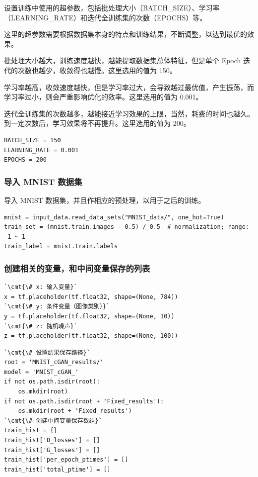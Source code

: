 \documentclass[a4paper, 12pt]{article}
\begin{document}
设置训练中使用的超参数，包括批处理大小（BATCH\_SIZE）、学习率（LEARNING\_RATE）和迭代全训练集的次数（EPOCHS）等。

这里的超参数需要根据数据集本身的特点和训练结果，不断调整，以达到最优的效果。

批处理大小越大，训练速度越快，越能提取数据集总体特征，但是单个 Epoch 迭代的次数也越少，收敛得也越慢。这里选用的值为 150。

学习率越高，收敛速度越快，但是学习率过大，会导致越过最优值，产生振荡，而学习率过小，则会严重影响优化的效率。这里选用的值为 0.001。

迭代全训练集的次数越多，越能接近学习效果的上限，当然，耗费的时间也越久。到一定次数后，学习效果将不再提升。这里选用的值为 200。

\begin{lstlisting}[style=myPython,caption={设置超参数}]
BATCH_SIZE = 150
LEARNING_RATE = 0.001
EPOCHS = 200
\end{lstlisting}

\subsubsection{导入 MNIST 数据集}

导入 MNIST 数据集，并且作相应的预处理，以用于之后的训练。

\begin{lstlisting}[style=myPython,caption={导入 MNIST 数据集}]
mnist = input_data.read_data_sets("MNIST_data/", one_hot=True)
train_set = (mnist.train.images - 0.5) / 0.5  # normalization; range: -1 ~ 1
train_label = mnist.train.labels
\end{lstlisting}

\subsubsection{创建相关的变量，和中间变量保存的列表}

\begin{lstlisting}[style=myPython,caption={创建输入变量 $x$、随机噪声 $z$、条件变量 $y$}]
`\cmt{\# x: 输入变量}`
x = tf.placeholder(tf.float32, shape=(None, 784))
`\cmt{\# y: 条件变量（图像类别）}`
y = tf.placeholder(tf.float32, shape=(None, 10))
`\cmt{\# z: 随机噪声}`
z = tf.placeholder(tf.float32, shape=(None, 100))
\end{lstlisting}

\begin{lstlisting}[style=myPython,caption={设置结果保存路径，创建中间变量保存数组}]
`\cmt{\# 设置结果保存路径}`
root = 'MNIST_cGAN_results/'
model = 'MNIST_cGAN_'
if not os.path.isdir(root):
    os.mkdir(root)
if not os.path.isdir(root + 'Fixed_results'):
    os.mkdir(root + 'Fixed_results')
`\cmt{\# 创建中间变量保存数组}`
train_hist = {}
train_hist['D_losses'] = []
train_hist['G_losses'] = []
train_hist['per_epoch_ptimes'] = []
train_hist['total_ptime'] = []
\end{lstlisting}
\end{document}

